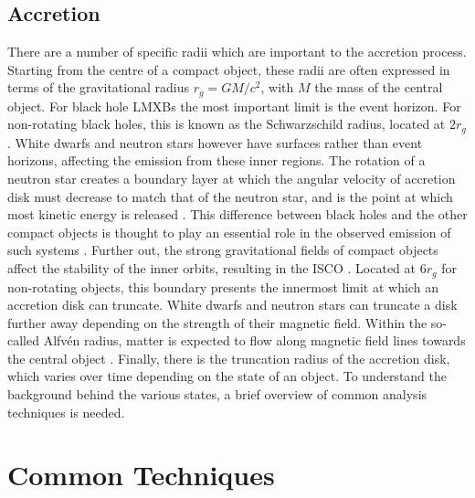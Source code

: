 \subsection{Accretion}
There are a number of specific radii which are important to the accretion process. Starting from the centre of a compact object, these radii are often expressed in terms of the  gravitational radius $r_g=GM/c^2$, with $M$ the mass of the central object. For black hole \acp{LMXB} the most important limit is the event horizon. For non-rotating black holes, this is known as the Schwarzschild radius, located at $2r_g$ \citep{schwarzschild1916gravitationsfeld}. White dwarfs and neutron stars however have surfaces rather than event horizons, affecting the emission from these inner regions. The rotation of a neutron star creates a boundary layer at which the angular velocity of accretion disk must decrease to match that of the neutron star, and is the point at which most kinetic energy is released \citep{frank2002accretion, done2007modelling}. This difference between black holes and the other compact objects is thought to play an essential role in the observed emission of such systems \citep[e.g.][]{ghosh1978disk,shakura1988theory,popham2001accretion}. Further out, the strong gravitational fields of compact objects affect the stability of the inner orbits, resulting in the \ac{ISCO} \citep{misner1973gravitation}. Located at $6r_g$ for non-rotating objects, this boundary presents the innermost limit at which an accretion disk can truncate. White dwarfs and neutron stars can truncate a disk further away depending on the strength of their magnetic field. Within the so-called Alfv\'en radius, matter is expected to flow along magnetic field lines towards the central object \citep{lamb1973model}. Finally, there is the truncation radius of the accretion disk, which varies over time depending on the state of an object. To understand the background behind the various states, a brief overview of common analysis techniques is needed.\\

\section{Common Techniques}
\label{sec:commontechniques}

